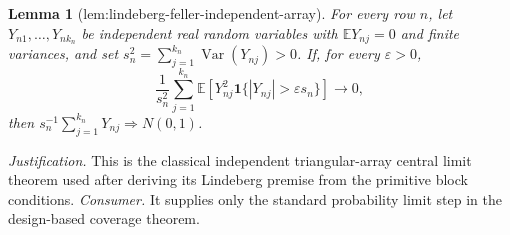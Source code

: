 \documentclass{article}
\newtheorem{lemma}{Lemma}
\begin{document}
\begin{lemma}[lem:lindeberg-feller-independent-array]\label{lem:lindeberg-feller-independent-array}
For every row \(n\), let \(Y_{n1},\ldots,Y_{nk_n}\) be independent real random variables with \(\mathbb E Y_{nj}=0\) and finite variances, and set \(s_n^2=\sum_{j=1}^{k_n}\operatorname{Var}(Y_{nj})>0\). If, for every \(\varepsilon>0\),
\[
 \frac{1}{s_n^2}\sum_{j=1}^{k_n}
 \mathbb E\!\left[Y_{nj}^2\mathbf 1\{|Y_{nj}|>\varepsilon s_n\}\right]
 \longrightarrow 0,
\]
then \(s_n^{-1}\sum_{j=1}^{k_n}Y_{nj}\Rightarrow N(0,1)\).
\end{lemma}
\par\smallskip\noindent \textit{Justification.} This is the classical independent triangular-array central limit theorem used after deriving its Lindeberg premise from the primitive block conditions. \textit{Consumer.} It supplies only the standard probability limit step in the design-based coverage theorem.
\end{document}

